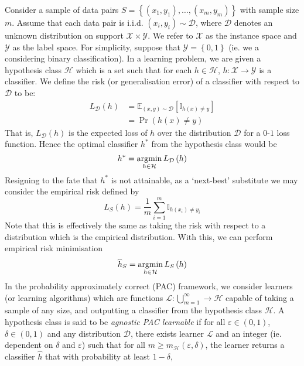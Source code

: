 \documentclass[11pt]{report} %
\begin{document}
Consider a sample of data pairs $S = \left\{\left(x_{1}, y_{1}\right), \dots, \left(x_{m}, y_{m}\right)\right\}$ with sample size $m$. Assume that each data pair is i.i.d. $\left(x_{i}, y_{i}\right) \sim \mathcal{D}$, where $\mathcal{D}$ denotes an unknown distribution on support $\mathcal{X}\times\mathcal{Y}$. We refer to $\mathcal{X}$ as the instance space and $\mathcal{Y}$ as the label space. For simplicity, suppose that $\mathcal{Y} = \left\{0, 1\right\}$ (ie. we a considering binary classification). In a learning problem, we are given a hypothesis class $\mathcal{H}$ which is a set such that for each $h \in \mathcal{H}$, $h: \mathcal{X} \to \mathcal{Y}$ is a classifier. We define the risk (or generalisation error) of a classifier with respect to $\mathcal{D}$ to be:
\begin{align}
L_{\mathcal{D}}\left(h\right) &= \mathbb{E}_{\left(x, y\right)\sim\mathcal{D}}\left[\mathbb{I}_{h\left(x\right) \neq y}\right] \\
&= \operatorname{Pr}\left(h\left(x\right) \neq y\right)
\end{align}
That is, $L_{\mathcal{D}}\left(h\right)$ is the expected loss of $h$ over the distribution $\mathcal{D}$ for a $0$-$1$ loss function. Hence the optimal classifier $h^{*}$ from the hypothesis class would be
\begin{equation}
h^{*} = \operatorname*{argmin}_{h \in \mathcal{H}}L_{\mathcal{D}}\left(h\right)
\end{equation}
Resigning to the fate that $h^{*}$ is not attainable, as a `next-best' substitute we may consider the empirical risk defined by
\begin{equation}
L_{S}\left(h\right) = \dfrac{1}{m}\sum_{i = 1}^{m}\mathbb{I}_{h\left(x_{i}\right) \neq y_{i}}
\end{equation}
Note that this is effectively the same as taking the risk with respect to a distribution which is the empirical distribution. With this, we can perform empirical risk minimisation
\begin{equation}
\widehat{h}_{S} = \operatorname*{argmin}_{h \in \mathcal{H}}L_{S}\left(h\right) 
\end{equation}
In the probability approximately correct (PAC) framework, we consider learners (or learning algorithms) which are functions $\mathcal{L}: \bigcup_{m = 1}^{\infty} \to \mathcal{H}$ capable of taking a sample of any size, and outputting a classifier from the hypothesis class $\mathcal{H}$. A hypothesis class is said to be \textit{agnostic PAC learnable} if for all $\varepsilon \in \left(0, 1\right)$, $\delta \in \left(0, 1\right)$ and any distribution $\mathcal{D}$, there exists learner $\mathcal{L}$ and an integer  (ie. dependent on $\delta$ and $\varepsilon$) such that for all $m \geq m_{\mathcal{H}}\left(\varepsilon, \delta\right)$, the learner returns a classifier $\widehat{h}$ that with probability at least $1 - \delta$,
\end{document}
